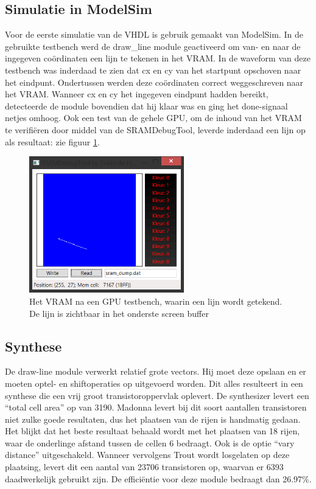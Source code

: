 \documentclass{scrartcl} %
\begin{document}
\subsection{Simulatie in ModelSim}
Voor de eerste simulatie van de VHDL is gebruik gemaakt van ModelSim. In de gebruikte testbench werd de draw\_line module geactiveerd om van- en naar de ingegeven coördinaten een lijn te tekenen in het VRAM. In de waveform van deze testbench was inderdaad te zien dat cx en cy van het startpunt opschoven naar het eindpunt. Ondertussen werden deze coördinaten correct weggeschreven naar het VRAM. Wanneer cx en cy het ingegeven eindpunt hadden bereikt, detecteerde de module bovendien dat hij klaar was en ging het done-signaal netjes omhoog.
Ook een test van de gehele GPU, om de inhoud van het VRAM te verifiëren door middel van de SRAMDebugTool, leverde inderdaad een lijn op als resultaat: zie figuur \ref{fig:draw-line-sram-dump}.

\begin{figure}[H]
	\centering
	\includegraphics[width=0.6\textwidth]{resource/sram_dump.png}
	\caption{Het VRAM na een GPU testbench, waarin een lijn wordt getekend. De lijn is zichtbaar in het onderste screen buffer}
	\label{fig:draw-line-sram-dump}
\end{figure}

\subsection{Synthese}
De draw-line module verwerkt relatief grote vectors. Hij moet deze opslaan en er moeten optel- en shiftoperaties op uitgevoerd worden. Dit alles resulteert in een synthese die een vrij groot transistoroppervlak oplevert. De synthesizer levert een ``total cell area'' op van 3190. Madonna levert bij dit soort aantallen transistoren niet zulke goede resultaten, dus het plaatsen van de rijen is handmatig gedaan. Het blijkt dat het beste resultaat behaald wordt met het plaatsen van 18 rijen, waar de onderlinge afstand tussen de cellen 6 bedraagt. Ook is de optie ``vary distance'' uitgeschakeld. Wanneer vervolgens Trout wordt losgelaten op deze plaatsing, levert dit een aantal van 23706 transistoren op, waarvan er 6393 daadwerkelijk gebruikt zijn. De efficiëntie voor deze module bedraagt dan 26.97\%.
\end{document}
